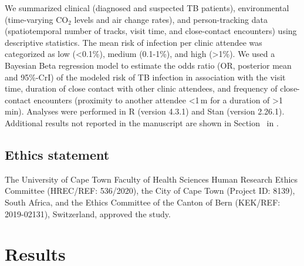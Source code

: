 \documentclass[fleqn,11pt]{wlscirep}
\begin{document}
We summarized clinical (diagnosed and suspected TB patients), environmental (time-varying CO$_2$ levels and air change rates), and person-tracking data (spatiotemporal number of tracks, visit time, and close-contact encounters) using descriptive statistics.   The mean risk of infection per clinic attendee was categorized as low (<0.1\%), medium (0.1-1\%), and high (>1\%). We used a Bayesian Beta regression model to estimate the odds ratio (OR, posterior mean and 95\%-CrI) of the modeled risk of TB infection in association with the visit time, duration of close contact with other clinic attendees, and frequency of close-contact encounters (proximity to another attendee <1\,m for a duration of >1\,min). Analyses were performed in R (version 4.3.1) and Stan (version 2.26.1). Additional results not reported in the manuscript are shown in Section~ in \supp. 

\subsection*{Ethics statement}

The University of Cape Town Faculty of Health Sciences Human Research Ethics Committee (HREC/REF: 536/2020), the City of Cape Town (Project ID: 8139), South Africa, and the Ethics Committee of the Canton of Bern (KEK/REF: 2019-02131), Switzerland, approved the study.

\newpage

\section*{Results}
\end{document}
